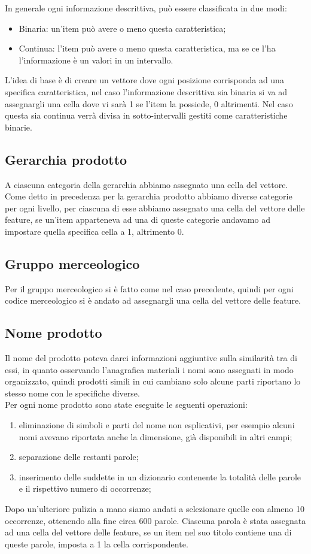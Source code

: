 In generale ogni informazione descrittiva, può essere classificata in due modi:
\begin{itemize}
    \item Binaria: un'item può avere o meno questa caratteristica;
    \item Continua: l'item può avere o meno questa caratteristica, ma se ce l'ha l'informazione è un valori in un intervallo.
\end{itemize}

L'idea di base è di creare un vettore dove ogni posizione corrisponda ad una specifica caratteristica, nel caso l'informazione descrittiva sia binaria si va ad assegnargli una cella dove vi sarà 1 se l'item la possiede, 0 altrimenti. Nel caso questa sia continua verrà divisa in sotto-intervalli gestiti come caratteristiche binarie.

\subsection{Gerarchia prodotto}
A ciascuna categoria della gerarchia abbiamo assegnato una cella del vettore.
Come detto in precedenza per la gerarchia prodotto abbiamo diverse categorie per ogni livello, per ciascuna di esse abbiamo assegnato una cella del vettore delle feature, se un'item apparteneva ad una di queste categorie andavamo ad impostare quella specifica cella a 1, altrimento 0.

\subsection{Gruppo merceologico}
Per il gruppo merceologico si è fatto come nel caso precedente, quindi per ogni codice merceologico si è andato ad assegnargli una cella del vettore delle feature.

\subsection{Nome prodotto}
Il nome del prodotto poteva darci informazioni aggiuntive sulla similarità tra di essi, in quanto osservando l'anagrafica materiali i nomi sono assegnati in modo organizzato, quindi prodotti simili in cui cambiano solo alcune parti riportano lo stesso nome con le specifiche diverse.\\
Per ogni nome prodotto sono state eseguite le seguenti operazioni:
\begin{enumerate}
    \item eliminazione di simboli e parti del nome non esplicativi, per esempio alcuni nomi avevano riportata anche la dimensione, già disponibili in altri campi;
    \item separazione delle restanti parole;
    \item inserimento delle suddette in un dizionario contenente la totalità delle parole e il rispettivo numero di occorrenze;
\end{enumerate}
Dopo un'ulteriore pulizia a mano siamo andati a selezionare quelle con almeno 10 occorrenze, ottenendo alla fine circa 600 parole. Ciascuna parola è stata assegnata ad una cella del vettore delle feature, se un item nel suo titolo contiene una di queste parole, imposta a 1 la cella corrispondente.

